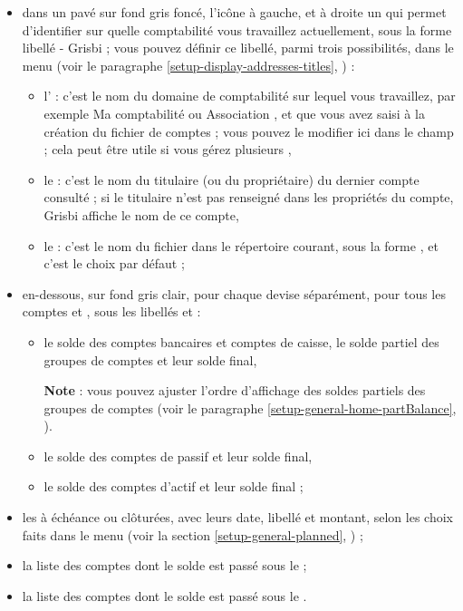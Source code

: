 \begin{itemize}
	 \item dans un pavé sur fond gris foncé{\couleur}, l'icône  à gauche, et à droite un  qui permet d'identifier sur quelle comptabilité vous travaillez actuellement, sous la forme \og libellé - Grisbi\fg{} ; vous pouvez définir ce libellé, parmi trois possibilités, dans le menu  (voir le paragraphe \vref{setup-display-addresses-titles}, ) :
		\begin{itemize}
			 \item l' : c'est le nom du domaine de comptabilité sur lequel vous travaillez, par exemple \og Ma comptabilité \fg{} ou \og Association \fg{}, et que vous avez saisi à la création du fichier de comptes ; vous pouvez le modifier ici dans le champ  ; cela peut être utile si vous gérez plusieurs , 
			 \item le  : c'est le nom du titulaire (ou du propriétaire) du dernier compte consulté ; si le titulaire n'est pas renseigné dans les propriétés du compte, Grisbi affiche le nom de ce compte,
			 \item le  : c'est le nom du fichier dans le répertoire courant, sous la forme , et c'est le choix par défaut ;
		\end{itemize}
	 \item en-dessous, sur fond gris clair{\couleur}, pour chaque devise séparément, pour tous les comptes et , sous les libellés  et  :
		\begin{itemize}
			 \item le solde des comptes bancaires et comptes de caisse, le solde partiel des groupes de comptes et leur solde final,

			 \textbf{Note} : vous pouvez ajuster l'ordre d'affichage des soldes partiels des groupes de comptes (voir le paragraphe \vref{setup-general-home-partBalance}, ).			 
			 \item le solde des comptes de passif et leur solde final,
			 \item le solde des comptes d'actif et leur solde final ;
		\end{itemize}
	\item les  à échéance ou clôturées, avec leurs date, libellé et montant, selon les choix faits dans le menu  (voir la section \vref{setup-general-planned}, ) ;
	\item la liste des comptes dont le solde est passé sous le  ;
	\item la liste des comptes dont le solde est passé sous le .
\end{itemize}

